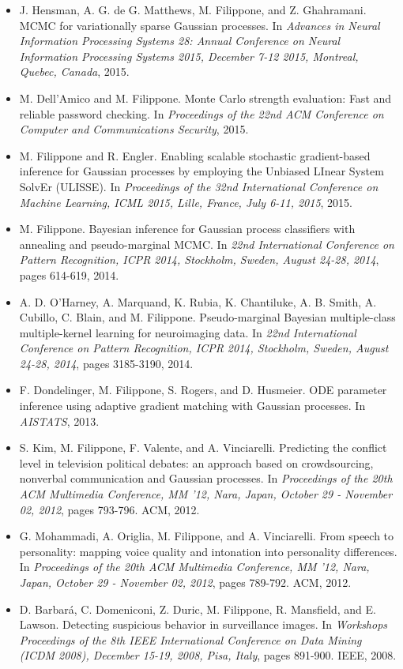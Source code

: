 \begin{itemize}
\item  J. Hensman, A. G. de G. Matthews, M. Filippone, and Z. Ghahramani. MCMC for variationally sparse Gaussian processes. In \emph{Advances in Neural Information Processing Systems 28: Annual Conference on Neural Information Processing Systems 2015, December 7-12 2015, Montreal, Quebec, Canada}, 2015. 
\item  M. Dell'Amico and M. Filippone. Monte Carlo strength evaluation: Fast and reliable password checking. In \emph{Proceedings of the 22nd ACM Conference on Computer and Communications Security}, 2015. 
\item  M. Filippone and R. Engler. Enabling scalable stochastic gradient-based inference for Gaussian processes by employing the Unbiased LInear System SolvEr (ULISSE). In \emph{Proceedings of the 32nd International Conference on Machine Learning, ICML 2015, Lille, France, July 6-11, 2015}, 2015. 
\item  M. Filippone. Bayesian inference for Gaussian process classifiers with annealing and pseudo-marginal MCMC. In \emph{22nd International Conference on Pattern Recognition, ICPR 2014, Stockholm, Sweden, August 24-28, 2014}, pages 614-619, 2014.  
\item  A. D. O'Harney, A. Marquand, K. Rubia, K. Chantiluke, A. B. Smith, A. Cubillo, C. Blain, and M. Filippone. Pseudo-marginal Bayesian multiple-class multiple-kernel learning for neuroimaging data. In \emph{22nd International Conference on Pattern Recognition, ICPR 2014, Stockholm, Sweden, August 24-28, 2014}, pages 3185-3190, 2014.  
\item  F. Dondelinger, M. Filippone, S. Rogers, and D. Husmeier. ODE parameter inference using adaptive gradient matching with Gaussian processes. In \emph{AISTATS}, 2013. 
\item  S. Kim, M. Filippone, F. Valente, and A. Vinciarelli. Predicting the conflict level in television political debates: an approach based on crowdsourcing, nonverbal communication and Gaussian processes. In \emph{Proceedings of the 20th ACM Multimedia Conference, MM '12, Nara, Japan, October 29 - November 02, 2012}, pages 793-796. ACM, 2012.  
\item  G. Mohammadi, A. Origlia, M. Filippone, and A. Vinciarelli. From speech to personality: mapping voice quality and intonation into personality differences. In \emph{Proceedings of the 20th ACM Multimedia Conference, MM '12, Nara, Japan, October 29 - November 02, 2012}, pages 789-792. ACM, 2012.  
\item  D. Barbar\'a, C. Domeniconi, Z. Duric, M. Filippone, R. Mansfield, and E. Lawson. Detecting suspicious behavior in surveillance images. In \emph{Workshops Proceedings of the 8th IEEE International Conference on Data Mining (ICDM 2008), December 15-19, 2008, Pisa, Italy}, pages 891-900. IEEE, 2008.  

\end{itemize}

